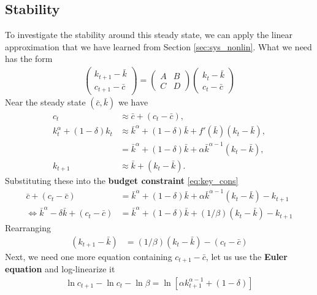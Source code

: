 \documentclass[11pt,a4paper]{book}
\theoremstyle{definition}\newtheorem{definition}{Definition}
\theoremstyle{definition}\newtheorem{fact}{Fact}
\theoremstyle{definition}\newtheorem{remark}{Remark}
\theoremstyle{definition}\newtheorem{ex}{Ex.}
\theoremstyle{definition}\newtheorem{project}{Project}
\theoremstyle{definition}\newtheorem{problem}{Problem}
\theoremstyle{definition}\newtheorem{example}{Example}
\numberwithin{theorem}{section}
\numberwithin{corollary}{chapter}
\numberwithin{assumption}{chapter}
\numberwithin{definition}{chapter}
\numberwithin{prop}{chapter}
\numberwithin{notation}{chapter}
\numberwithin{problem}{chapter}
\numberwithin{example}{chapter}
\numberwithin{fact}{chapter}
\numberwithin{ex}{chapter}
\begin{document}
	\subsection{Stability}
	To investigate the stability around this steady state, we can apply the linear approximation that we have learned from Section \ref{sec:sys_nonlin}. What we need has the form
	\begin{align}
		\begin{pmatrix}
			k_{t+1} - \bar{k} \\ c_{t+1} - \bar{c}
		\end{pmatrix}
		=  
		\begin{pmatrix}
			A & B \\ C & D
		\end{pmatrix}
		\begin{pmatrix}
			k_{t} - \bar{k} \\ c_{t} - \bar{c}
		\end{pmatrix} \label{eq:general_form}
	\end{align}
	Near the steady state $(\bar{c},\bar{k})$ we have
	\begin{align*}
		c_t &\approx \bar{c} + (c_t - \bar{c}), \\
		k_t^\alpha + (1-\delta)k_t &\approx \bar{k}^\alpha + (1-\delta)\bar{k} + f'(\bar{k})(k_t - \bar{k}), \\
		&= \bar{k}^\alpha + (1-\delta)\bar{k} + \alpha\bar{k}^{\alpha-1}(k_t - \bar{k}), \\
		k_{t+1} &\approx \bar{k} + (k_t -\bar{k}).
	\end{align*}
	Substituting these into the \textbf{budget constraint} \eqref{eq:key_cons}
	\begin{align*}
		\bar{c} + (c_t - \bar{c}) &= \bar{k}^\alpha + (1-\delta)\bar{k} + \alpha\bar{k}^{\alpha-1}(k_t - \bar{k}) - k_{t+1} \\
		\Leftrightarrow \bar{k}^\alpha - \delta\bar{k} + (c_t - \bar{c}) &= \bar{k}^\alpha + (1-\delta)\bar{k} + (1/\beta)(k_t - \bar{k}) - k_{t+1}
	\end{align*}
	Rearranging
	\begin{align}
		( k_{t+1} - \bar{k}) &= (1/\beta)(k_t - \bar{k}) - (c_t - \bar{c}) \label{eq:key1}
	\end{align}
	Next, we need one more equation containing $c_{t+1} - \bar{c}$, let us use the \textbf{Euler equation} and log-linearize it
	\begin{align*}
		\ln c_{t+1} - \ln c_t - \ln\beta = \ln [\alpha k_{t+1}^{\alpha-1} + (1-\delta) ]
	\end{align*}
\end{document}
